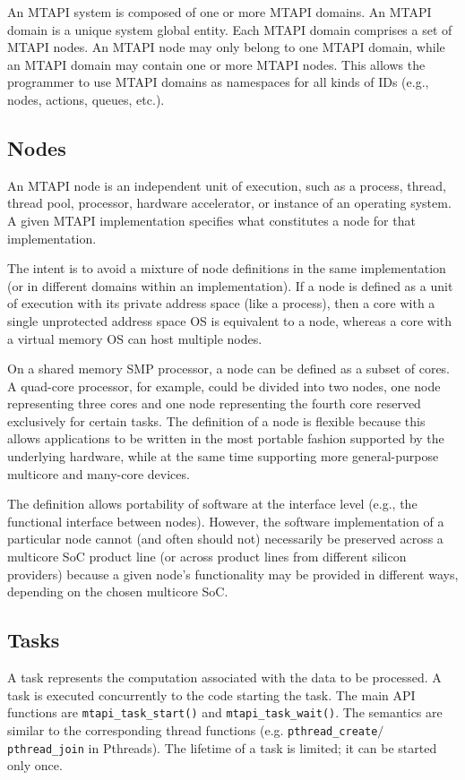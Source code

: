 An MTAPI system is composed of one or more MTAPI domains. An MTAPI domain is a unique system global entity. Each MTAPI domain comprises a set of MTAPI nodes. An MTAPI node may only belong to one MTAPI domain, while an MTAPI domain may contain one or more MTAPI nodes. This allows the programmer to use MTAPI domains as namespaces for all kinds of IDs (e.g., nodes, actions, queues, etc.).

\subsection{Nodes}

An MTAPI node is an independent unit of execution, such as a process, thread, thread pool, processor, hardware accelerator, or instance of an operating system. A given MTAPI implementation specifies what constitutes a node for that implementation.

The intent is to avoid a mixture of node definitions in the same implementation (or in different domains within an implementation). If a node is defined as a unit of execution with its private address space (like a process), then a core with a single unprotected address space OS is equivalent to a node, whereas a core with a virtual memory OS can host multiple nodes.

On a shared memory SMP processor, a node can be defined as a subset of cores. A quad-core processor, for example, could be divided into two nodes, one node representing three cores and one node representing the fourth core reserved exclusively for certain tasks. The definition of a node is flexible because this allows applications to be written in the most portable fashion supported by the underlying hardware, while at the same time supporting more general-purpose multicore and many-core devices.

The definition allows portability of software at the interface level (e.g., the functional interface between nodes). However, the software implementation of a particular node cannot (and often should not) necessarily be preserved across a multicore SoC product line (or across product lines from different silicon providers) because a given node's functionality may be provided in different ways, depending on the chosen multicore SoC.

\subsection{Tasks}

A task represents the computation associated with the data to be processed. A task is executed concurrently to the code starting the task. The main API functions are \lstinline|mtapi_task_start()| and \lstinline|mtapi_task_wait()|. The semantics are similar to the corresponding thread functions (e.g. \lstinline|pthread_create|$/$\lstinline|pthread_join| in Pthreads). The lifetime of a task is limited; it can be started only once.

